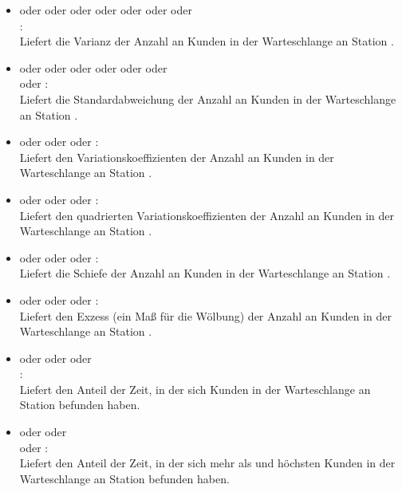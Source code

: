 \begin{itemize}
\item
{} oder  oder  oder  oder  oder  oder  oder\\
:\\
Liefert die Varianz der Anzahl an Kunden in der Warteschlange an Station .

\item
{} oder  oder  oder  oder  oder  oder\\  oder :\\
Liefert die Standardabweichung der Anzahl an Kunden in der Warteschlange an Station .

\item
{} oder  oder  oder :\\
Liefert den Variationskoeffizienten der Anzahl an Kunden in der Warteschlange an Station .

\item
{} oder  oder  oder :\\
Liefert den quadrierten Variationskoeffizienten der Anzahl an Kunden in der Warteschlange an Station .

\item
{} oder  oder  oder :\\
Liefert die Schiefe der Anzahl an Kunden in der Warteschlange an Station .

\item
{} oder  oder  oder :\\
Liefert den Exzess (ein Maß für die Wölbung) der Anzahl an Kunden in der Warteschlange an Station .

\item
{} oder  oder  oder\\ :\\
Liefert den Anteil der Zeit, in der sich  Kunden in der Warteschlange an Station  befunden haben.

\item
{} oder  oder\\  oder :\\
Liefert den Anteil der Zeit, in der sich mehr als  und höchsten  Kunden in der Warteschlange an Station  befunden haben.

\end{itemize}
